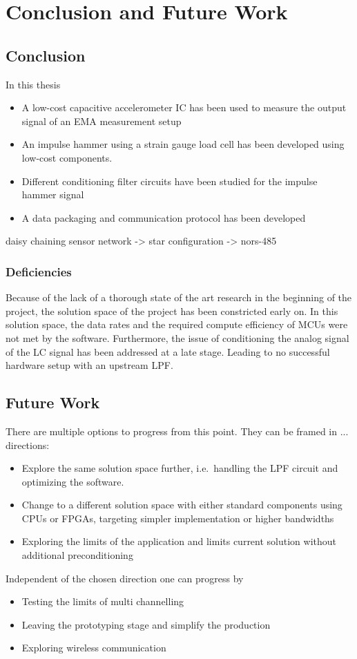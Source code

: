 \chapter{Conclusion and Future Work}

\section{Conclusion}
In this thesis
\begin{itemize}
  \item A low-cost capacitive accelerometer \ac{IC} has been used to measure the output signal of an \ac{EMA} measurement setup
  \item An impulse hammer using a strain gauge load cell has been developed using low-cost components.
  \item Different conditioning filter circuits have been studied for the impulse hammer signal
  \item A data packaging and communication protocol has been developed
\end{itemize}

daisy chaining sensor network -> star configuration -> nors-485

\subsection{Deficiencies}
Because of the lack of a thorough state of the art research in the beginning of the project, the solution space of the project has been constricted early on. In this solution space, the data rates and the required compute efficiency of \ac{MCU}s were not met by the software. Furthermore, the issue of conditioning the analog signal of the \ac{LC} signal has been addressed at a late stage. Leading to no successful hardware setup with an upstream \ac{LPF}.

\newpage
\section{Future Work}
There are multiple options to progress from this point. They can be framed in ... directions:
\begin{itemize}
  \item Explore the same solution space further, i.e.\ handling the \ac{LPF} circuit and optimizing the software.
  \item Change to a different solution space with either standard components using \ac{CPU}s or \ac{FPGA}s, targeting simpler implementation or higher bandwidths
  \item Exploring the limits of the application and limits current solution without additional preconditioning
\end{itemize}

Independent of the chosen direction one can progress by
\begin{itemize}
  \item Testing the limits of multi channelling
  \item Leaving the prototyping stage and simplify the production
  \item Exploring wireless communication
\end{itemize}

